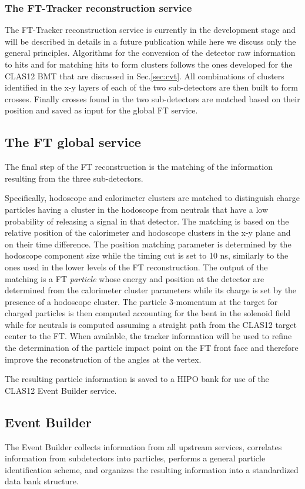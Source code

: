 \documentclass[3p,times,twocolumn]{elsarticle}
\begin{document}
\subsubsection{The FT-Tracker reconstruction service}
The FT-Tracker reconstruction service is currently in the development stage and will be described in details in a future publication while here we discuss only the general principles.
Algorithms for the conversion of the detector raw information to hits and for matching hits to form clusters follows the ones developed for the CLAS12 BMT that are discussed in Sec.\ref{sec:cvt}. All combinations of clusters identified in the x-y layers of each of the two sub-detectors are then built to form crosses. Finally crosses found in the two sub-detectors are matched based on their position and saved as input for the global FT service.

\subsection{The FT global service}
The final step of the FT reconstruction is the matching of the information resulting from the three sub-detectors.

Specifically, hodoscope and calorimeter clusters are matched to distinguish charge particles having a cluster in the hodoscope from neutrals that have a low probability of releasing a signal in that detector. The matching is based on the relative position of the calorimeter and hodoscope clusters in the x-y plane and on their time difference. The position matching parameter is determined by the hodoscope component size while the timing cut is set to 10 ns, similarly to the ones used in the lower levels of the FT reconstruction. The output of the matching is a FT {\it particle} whose energy and position at the detector are determined from the calorimeter cluster parameters while its charge is set by the presence of a hodoscope cluster. The particle 3-momentum at the target for charged particles is then computed accounting for the bent in the solenoid field while for neutrals is computed assuming a straight path from the CLAS12 target center to the FT. When available, the tracker information will be used to refine the determination of the particle impact point on the FT front face and therefore improve the reconstruction of the angles at the vertex.

The resulting particle information is saved to a HIPO bank for use of the CLAS12 Event Builder service.

\subsection{Event Builder}
The Event Builder collects information from all upstream services, correlates information from subdetectors into particles, performs a general particle identification scheme, and organizes the resulting information into a standardized data bank structure.
\end{document}
